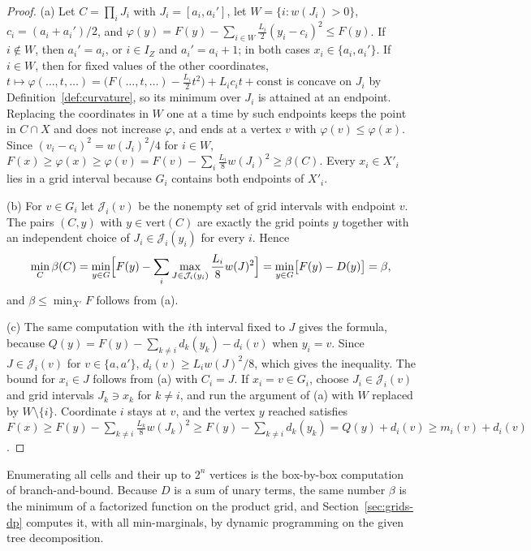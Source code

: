 \begin{proof}
(a) Let $C=\prod_iJ_i$ with $J_i=[a_i,a_i']$, let $W=\{i:w(J_i)>0\}$,
$c_i=(a_i+a_i')/2$, and
$\varphi(y)=F(y)-\sum_{i\in W}\frac{L_i}{2}(y_i-c_i)^2\le F(y)$. If $i\notin W$,
then $a_i'=a_i$, or $i\in I_Z$ and $a_i'=a_i+1$; in both cases
$x_i\in\{a_i,a_i'\}$. If $i\in W$, then for fixed values of the other
coordinates,
$t\mapsto\varphi(\dots,t,\dots)=\bigl(F(\dots,t,\dots)-\frac{L_i}2t^2\bigr)
+L_ic_it+\mathrm{const}$ is concave on $J_i$ by
Definition~\ref{def:curvature}, so its minimum over $J_i$ is attained at an
endpoint. Replacing the coordinates in $W$ one at a time by such endpoints
keeps the point in $C\cap X$ and does not increase $\varphi$, and ends at a
vertex $v$ with $\varphi(v)\le\varphi(x)$. Since $(v_i-c_i)^2=w(J_i)^2/4$
for $i\in W$,
$F(x)\ge\varphi(x)\ge\varphi(v)=F(v)-\sum_i\frac{L_i}8w(J_i)^2\ge\beta(C)$.
Every $x_i\in X'_i$ lies in a grid interval because $G_i$ contains both
endpoints of $X'_i$.

(b) For $v\in G_i$ let $\mathcal J_i(v)$ be the nonempty set of grid intervals
with endpoint $v$. The pairs $(C,y)$ with $y\in\mathrm{vert}(C)$ are exactly
the grid points $y$ together with an independent choice of
$J_i\in\mathcal J_i(y_i)$ for every $i$. Hence
\[
\min_C\beta(C)=\min_{y\in G}\Bigl[F(y)-\sum_i\max_{J\in\mathcal J_i(y_i)}
\frac{L_i}8w(J)^2\Bigr]=\min_{y\in G}\bigl[F(y)-D(y)\bigr]=\beta ,
\]
and $\beta\le\min_{X'}F$ follows from (a).

(c) The same computation with the $i$th interval fixed to $J$ gives the
formula, because $Q(y)=F(y)-\sum_{k\ne i}d_k(y_k)-d_i(v)$ when $y_i=v$. Since
$J\in\mathcal J_i(v)$ for $v\in\{a,a'\}$, $d_i(v)\ge L_iw(J)^2/8$, which
gives the inequality. The bound for $x_i\in J$ follows from (a) with $C_i=J$.
If $x_i=v\in G_i$, choose $J_i\in\mathcal J_i(v)$ and grid intervals
$J_k\ni x_k$ for $k\ne i$, and run the argument of (a) with $W$ replaced by
$W\setminus\{i\}$. Coordinate $i$ stays at $v$, and the vertex $y$ reached
satisfies
$F(x)\ge F(y)-\sum_{k\ne i}\frac{L_k}8w(J_k)^2\ge F(y)-\sum_{k\ne i}d_k(y_k)
=Q(y)+d_i(v)\ge m_i(v)+d_i(v)$.
\end{proof}

Enumerating all cells and their up to $2^n$ vertices is the box-by-box
computation of branch-and-bound. Because $D$ is a sum of unary terms, the same
number $\beta$ is the minimum of a factorized function on the product grid,
and Section~\ref{sec:grids-dp} computes it, with all min-marginals, by
dynamic programming on the given tree decomposition.

